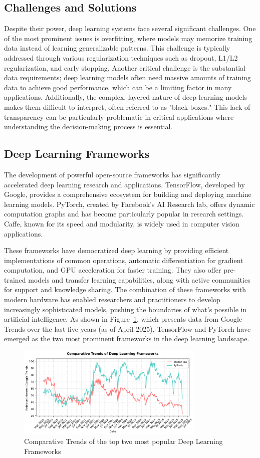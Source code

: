 \subsection{Challenges and Solutions}

Despite their power, deep learning systems face several significant
challenges. One of the most prominent issues is overfitting, where
models may memorize training data instead of learning generalizable
patterns. This challenge is typically addressed through various
regularization techniques such as dropout, L1/L2 regularization, and
early stopping. Another critical challenge is the substantial data
requirements; deep learning models often need massive amounts of
training data to achieve good performance, which can be a limiting
factor in many applications. Additionally, the complex, layered nature
of deep learning models makes them difficult to interpret, often
referred to as "black boxes." This lack of transparency can be
particularly problematic in critical applications where understanding
the decision-making process is essential.

\subsection{Deep Learning Frameworks}

The development of powerful open-source frameworks has significantly
accelerated deep learning research and applications. TensorFlow,
developed by Google, provides a comprehensive ecosystem for building
and deploying machine learning models. PyTorch, created by Facebook's AI
Research lab, offers dynamic computation graphs and has become
particularly popular in research settings. Caffe, known for its speed and modularity, is widely used in computer vision applications.

These frameworks have democratized deep learning by providing
efficient implementations of common operations, automatic
differentiation for gradient computation, and GPU acceleration for
faster training. They also offer pre-trained models and transfer
learning capabilities, along with active communities for support and
knowledge sharing. The combination of these frameworks with modern
hardware has enabled researchers and practitioners to develop
increasingly sophisticated models, pushing the boundaries of what's
possible in artificial intelligence. As shown in
Figure~\ref{fig:dl_frameworks_trends}, which presents data from
Google Trends over the last five years (as of April 2025), TensorFlow
and PyTorch have emerged as the two most prominent frameworks in the
deep learning landscape.

\begin{figure}[h]
  \centering
  \includegraphics[width=0.8\textwidth]{Cap2/Figures/dl_frameworks_trends.png}
  \caption{Comparative Trends of the top two most popular Deep
  Learning Frameworks}
  \label{fig:dl_frameworks_trends}
\end{figure}
